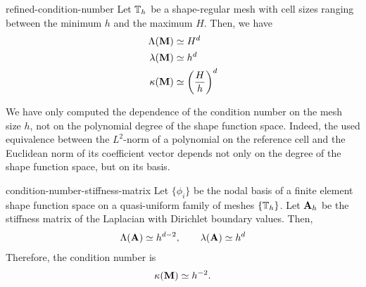 \begin{Corollary}{refined-condition-number}
  Let $\mathbb T_h$ be a shape-regular mesh with cell sizes ranging
  between the minimum $h$ and the maximum $H$. Then, we have
  \begin{align*}
    \Lambda(\mathbf M) &\simeq H^{d} \\
    \lambda(\mathbf M) &\simeq h^{d} \\
    \kappa(\mathbf M) &\simeq \left(\frac Hh\right)^{d}
  \end{align*}
\end{Corollary}

\begin{remark}
  We have only computed the dependence of the condition number on the
  mesh size $h$, not on the polynomial degree of the shape function
  space. Indeed, the used equivalence between the $L^2$-norm of a
  polynomial on the reference cell and the Euclidean norm of its
  coefficient vector depends not only on the degree of the shape
  function space, but on its basis.
\end{remark}

\begin{Theorem}{condition-number-stiffness-matrix}
  Let $\{\phi_i\}$ be the nodal basis of a finite element shape
  function space on a quasi-uniform family of meshes
  $\{\mathbb T_h\}$. Let $\mathbf A_h$ be the stiffness matrix of the
  Laplacian with Dirichlet boundary values.  Then,
  \begin{gather*}
    \Lambda(\mathbf A) \simeq h^{d-2}, \qquad \lambda(\mathbf A)  \simeq h^{d}
  \end{gather*}
  Therefore, the condition number is
  \begin{gather*}
    \kappa(\mathbf M) \simeq h^{-2}.
  \end{gather*}
\end{Theorem}

